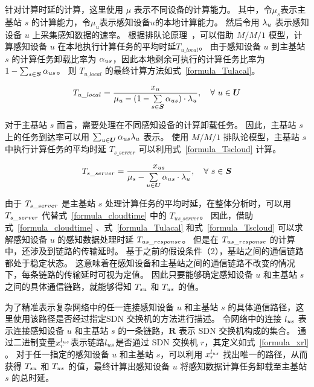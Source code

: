 针对计算时延的计算，这里使用 $\mu$ 表示不同设备的计算能力。
其中，令$\mu_s$表示主基站 $s$ 的计算能力，令$\mu_u$表示感知设备$u$的本地计算能力。
然后令用 ${\lambda}_{u}$ 表示感知设备 $u$ 上采集感知数据的速率。
根据排队论原理~\cite{Queueing:systems}，可以借助 $M/M/1$ 模型，计算感知设备 $u$ 在本地执行计算任务的平均时延$T_{u\_local}$。
由于感知设备 $u$ 到主基站 $s$ 的计算任务卸载比率为 ${\alpha}_{us}$，因此本地剩余可执行的计算任务比率为 $1 - \sum_{s \in \boldsymbol{S}}{\alpha}_{us}$。
则 $T_{u\_local}$ 的最终计算方法如式~\eqref{formula_Tulacal}。

\begin{equation}
  \label{formula_Tulacal}
  {T}_{u\_local} = \frac{{x}_{u}}{{\mu}_{u} - (1 - \sum\limits_{s \in \boldsymbol{S}} {\alpha}_{us}) \cdot {\lambda}_{u}}, \quad \forall \ u \in \boldsymbol{U}
\end{equation}

对于主基站 $s$ 而言，需要处理在不同感知设备的计算卸载任务。
因此，主基站 $s$ 上的任务到达率可以用 $\sum_{u \in \boldsymbol{U}} {\alpha}_{us} {\lambda}_{u}$ 表示。
使用 $M/M/1$ 排队论模型，主基站 $s$ 中执行计算任务的平均时延 $T_{s\_server}$ 可以利用式~\eqref{formula_Tscloud} 计算。

\begin{equation}
\label{formula_Tscloud}
{T}_{s\_server} = \frac{{x}_{us}}{{\mu}_{s} - \sum\limits_{u \in \boldsymbol{U}} {\alpha}_{us} \cdot {\lambda}_{u}}, \quad \forall \ s \in \boldsymbol{S}
\end{equation}

由于 ${T}_{s\_server}$ 是主基站 $s$ 处理计算任务的平均时延，在整体分析时，可以用 ${T}_{s\_server}$ 代替式~\eqref{formula_cloudtime} 中的 $T_{us\_server}$。
因此，借助式~\eqref{formula_cloudtime} 、式~\eqref{formula_Tulacal} 和式~\eqref{formula_Tscloud} 可以求解感知设备 $u$ 的感知数据处理时延 ${T}_{us\_response}$。
但是在 ${T}_{us\_response}$ 的计算中，还涉及到链路的传输延时。
基于之前的假设条件（2），基站之间的通信链路都处于稳定状态。
这意味着在感知设备和主基站之间的通信链路不改变的情况下，每条链路的传输延时可视为定值。
因此只要能够确定感知设备 $u$ 和主基站 $s$ 之间的具体通信链路，就能够得知 ${T}_{su}$ 和 ${T}_{us}$ 的值。

为了精准表示复杂网络中的任一连接感知设备 $u$ 和主基站 $s$ 的具体通信路径，这里使用该路径是否经过指定SDN 交换机的方法进行描述。
令网络中的连接 $l_{us}$ 表示连接感知设备 $u$ 和主基站 $s$ 的一条链路，$\boldsymbol{R}$ 表示 SDN 交换机构成的集合。
通过二进制变量$x^{l_{us}}_{r}$表示链路$l_{us}$是否通过 SDN 交换机 $r$，其定义如式~\eqref{formula_xrl} 。
对于任一指定的感知设备 $u$ 和主基站 $s$，可以利用 $x^{l_{us}}_{r}$ 找出唯一的路径，从而获得 ${T}_{su}$ 和 ${T}_{us}$ 的值，最终计算出感知设备 $u$ 将感知数据计算任务卸载至主基站 $s$ 的总时延。

